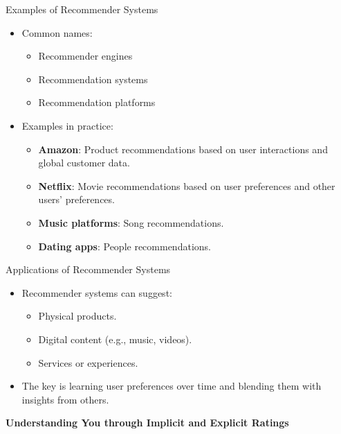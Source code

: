 \documentclass{beamer}
\begin{document}
\begin{frame}{Examples of Recommender Systems}
\begin{itemize}
    \item Common names:
    \begin{itemize}
        \item Recommender engines
        \item Recommendation systems
        \item Recommendation platforms
    \end{itemize}
    \item Examples in practice:
    \begin{itemize}
        \item \textbf{Amazon}: Product recommendations based on user interactions and global customer data.
        \item \textbf{Netflix}: Movie recommendations based on user preferences and other users' preferences.
        \item \textbf{Music platforms}: Song recommendations.
        \item \textbf{Dating apps}: People recommendations.
    \end{itemize}
\end{itemize}
\end{frame}

\begin{frame}{Applications of Recommender Systems}
\begin{itemize}
    \item Recommender systems can suggest:
    \begin{itemize}
        \item Physical products.
        \item Digital content (e.g., music, videos).
        \item Services or experiences.
    \end{itemize}
    \item The key is learning user preferences over time and blending them with insights from others.
\end{itemize}
\end{frame}

\begin{frame}[plain]
    \begin{center}
        {\LARGE \textbf{Understanding You through Implicit and Explicit Ratings}}
    \end{center}
\end{frame}
\end{document}
